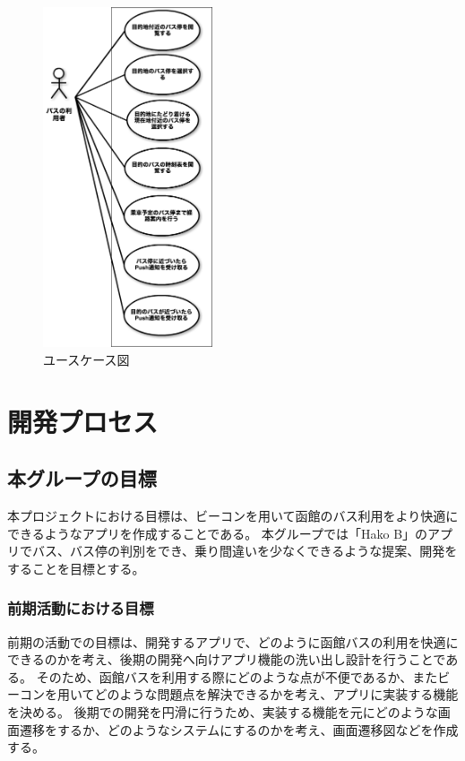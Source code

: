 \documentclass[openany,11pt,papersize]{jsbook}
\begin{document}
\begin{figure}[htbp]
  \begin{center}
    \includegraphics[clip,width=5.0cm]{img/usecase.png}
    \caption{ユースケース図}
    \label{fig:usecase}
  \end{center}
\end{figure}


\chapter{開発プロセス}
\section{本グループの目標}
本プロジェクトにおける目標は、ビーコンを用いて函館のバス利用をより快適にできるようなアプリを作成することである。
本グループでは「Hako B」のアプリでバス、バス停の判別をでき、乗り間違いを少なくできるような提案、開発をすることを目標とする。


\subsection{前期活動における目標}
前期の活動での目標は、開発するアプリで、どのように函館バスの利用を快適にできるのかを考え、後期の開発へ向けアプリ機能の洗い出し設計を行うことである。
そのため、函館バスを利用する際にどのような点が不便であるか、またビーコンを用いてどのような問題点を解決できるかを考え、アプリに実装する機能を決める。
後期での開発を円滑に行うため、実装する機能を元にどのような画面遷移をするか、どのようなシステムにするのかを考え、画面遷移図などを作成する。
\end{document}
